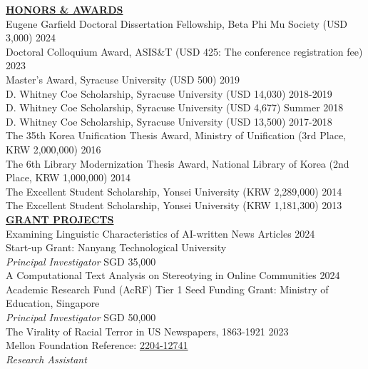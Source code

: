 \documentclass{article}
\begin{document}
\noindent \textbf{\underline{HONORS \& AWARDS}} \\
\noindent Eugene Garfield Doctoral Dissertation Fellowship, Beta Phi Mu Society (USD 3,000) \hfill 2024 \\
\noindent Doctoral Colloquium Award, ASIS\&T (USD 425: The conference registration fee) \hfill 2023 \\
\noindent Master's Award, Syracuse University (USD 500) \hfill 2019 \\
\noindent D. Whitney Coe Scholarship, Syracuse University (USD 14,030) \hfill 2018-2019 \\
\noindent D. Whitney Coe Scholarship, Syracuse University (USD 4,677) \hfill Summer 2018 \\
\noindent D. Whitney Coe Scholarship, Syracuse University (USD 13,500) \hfill 2017-2018 \\
\noindent The 35th Korea Unification Thesis Award, Ministry of Unification (3rd Place, KRW 2,000,000) \hfill 2016 \\
\noindent The 6th Library Modernization Thesis Award, National Library of Korea (2nd Place, KRW 1,000,000) \hfill 2014 \\
\noindent The Excellent Student Scholarship, Yonsei University (KRW 2,289,000)
\hfill 2014 \\
\noindent The Excellent Student Scholarship, Yonsei University (KRW 1,181,300) \hfill 2013 \\

\noindent \textbf{\underline{GRANT PROJECTS}} \\

\noindent Examining Linguistic Characteristics of AI-written News Articles \hfill 2024 \\
\null \hfill Start-up Grant: Nanyang Technological University \\
\textit{Principal Investigator} 
\null \hfill SGD 35,000 \\

\noindent A Computational Text Analysis on Stereotying in Online Communities \hfill 2024 \\
\null \hfill Academic Research Fund (AcRF) Tier 1 Seed Funding Grant: Ministry of Education, Singapore \\
\textit{Principal Investigator} 
\null \hfill SGD 50,000 \\

\noindent The Virality of Racial Terror in US Newspapers, 1863-1921 \hfill 2023 \\
\null \hfill Mellon Foundation Reference: \href{https://www.mellon.org/grant-details/the-virality-of-racial-terror-in-us-newspapers-1863-1921-20452145}{2204-12741}  \\
\textit{Research Assistant} \\
\end{document}
